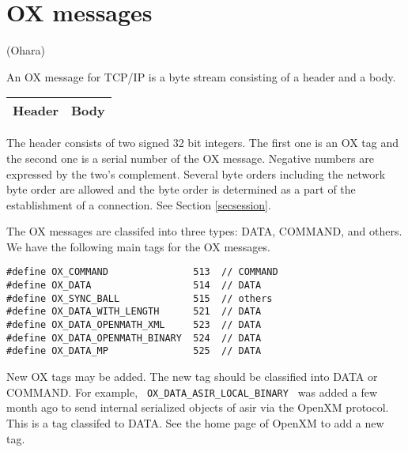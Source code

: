 
\section{OX messages}  (Ohara)

An OX message for TCP/IP is a byte stream consisting of
a header and a body.
\begin{center}
\begin{tabular}{|c|c|}
\hline
Header	& \hspace{10mm} Body \hspace{10mm} \\
\hline
\end{tabular}
\end{center}
The header consists of two signed 32 bit integers.
The first one is an OX tag 
and the second one is a serial number of the OX message.
Negative numbers are expressed by the two's complement.
Several byte orders including the network byte order
are allowed and the byte order is determined as a part of
the establishment of a connection. See Section \ref{secsession}.

The OX messages are classifed into three types:
DATA, COMMAND, and others.
We have the following main tags for the OX messages.
\begin{verbatim}
#define	OX_COMMAND               513  // COMMAND
#define	OX_DATA	                 514  // DATA
#define OX_SYNC_BALL             515  // others
#define OX_DATA_WITH_LENGTH      521  // DATA
#define OX_DATA_OPENMATH_XML     523  // DATA
#define OX_DATA_OPENMATH_BINARY  524  // DATA
#define OX_DATA_MP               525  // DATA
\end{verbatim}

New OX tags may be added.
The new tag should be classified into DATA or COMMAND.
For example, \verb+ OX_DATA_ASIR_LOCAL_BINARY +  was added a few month ago
to send internal serialized objects of asir via the OpenXM protocol.
This is a tag classifed to DATA.
See the home page of OpenXM to add a new tag.

